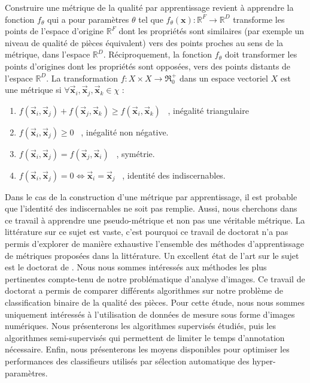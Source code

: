 Construire une métrique de la qualité par apprentissage revient à apprendre la fonction $f_{\theta}$ qui a pour paramètres $\theta$ tel que $f_{\theta}(\mathbf{x}) : \mathbb{R}^{F} \rightarrow \mathbb{R}^{D}$ transforme les points de l'espace d'origine $\mathbb{R}^{F}$ dont les propriétés sont similaires (par exemple un niveau de qualité de pièces équivalent) vers des points proches au sens de la métrique, dans l'espace $\mathbb{R}^{D}$.
Réciproquement, la fonction $f_{\theta}$ doit transformer les points d'origines dont les propriétés sont opposées, vers des points distants de l'espace $\mathbb{R}^{D}$.
La transformation $f : X \times X \rightarrow \Re_{0}^{+} $ dans un espace vectoriel $X$ est une métrique si $\forall \vec{\mathbf{x}}_{i}, \vec{\mathbf{x}}_{j}, \vec{\mathbf{x}}_{k} \in \chi$ :

\begin{enumerate}
\item $f\left(\vec{\mathbf{x}}_{i}, \vec{\mathbf{x}}_{j}\right) + f\left(\vec{\mathbf{x}}_{j}, \vec{\mathbf{x}}_{k}\right) \geq f\left(\vec{\mathbf{x}}_{i}, \vec{\mathbf{x}}_{k}\right)$ \ , inégalité triangulaire
\item $f\left(\vec{\mathbf{x}}_{i}, \vec{\mathbf{x}}_{j}\right) \geq 0$ \ , inégalité non négative.
\item $f\left(\vec{\mathbf{x}}_{i}, \vec{\mathbf{x}}_{j}\right)=f\left(\vec{\mathbf{x}}_{j}, \vec{\mathbf{x}}_{i}\right)$ \ , symétrie.
\item $f\left(\vec{\mathbf{x}}_{i}, \vec{\mathbf{x}}_{j}\right)=0 \Longleftrightarrow \vec{\mathbf{x}}_{i}=\vec{\mathbf{x}}_{j}$ \ , identité des indiscernables.
\end{enumerate}

Dans le cas de la construction d'une métrique par apprentissage, il est probable que l'identité des indiscernables ne soit pas remplie.
Aussi, nous cherchons dans ce travail à apprendre une pseudo-métrique et non pas une véritable métrique.
La littérature sur ce sujet est vaste, c'est pourquoi ce travail de doctorat n'a pas permis d'explorer de manière exhaustive l'ensemble des méthodes d'apprentissage de métriques proposées dans la littérature.
Un excellent état de l'art sur le sujet est le doctorat de \citeauthor{bellet_supervised_2012} \cite{bellet_supervised_2012}.
Nous nous sommes intéressés aux méthodes les plus pertinentes compte-tenu de notre problématique d'analyse d'images.
Ce travail de doctorat a permis de comparer différents algorithmes sur notre problème de classification binaire de la qualité des pièces.
Pour cette étude, nous nous sommes uniquement intéressés à l'utilisation de données de mesure sous forme d'images numériques.
Nous présenterons les algorithmes supervisés étudiés, puis les algorithmes semi-supervisés qui permettent de limiter le temps d'annotation nécessaire.
Enfin, nous présenterons les moyens disponibles pour optimiser les performances des classifieurs utilisés par sélection automatique des hyper-paramètres.


